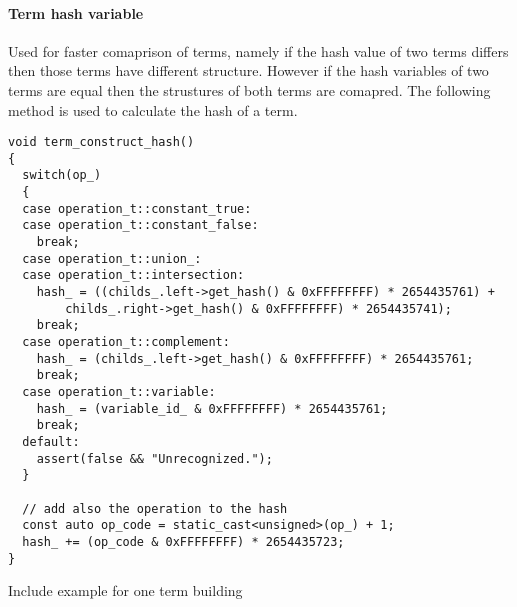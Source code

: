 \documentclass{article}
\begin{document}
	\paragraph{Term hash variable} Used for faster comaprison of terms, namely if the hash value of two terms 
	differs then those terms have different structure. However if the hash variables of two terms are equal then the strustures 
	of both terms are comapred. The following method is used to calculate the hash of a term.

	\begin{lstlisting}
void term_construct_hash()
{
  switch(op_)
  {
  case operation_t::constant_true:
  case operation_t::constant_false:
    break;
  case operation_t::union_:
  case operation_t::intersection:
    hash_ = ((childs_.left->get_hash() & 0xFFFFFFFF) * 2654435761) +
        childs_.right->get_hash() & 0xFFFFFFFF) * 2654435741);
    break;
  case operation_t::complement:
    hash_ = (childs_.left->get_hash() & 0xFFFFFFFF) * 2654435761;
    break;
  case operation_t::variable:
    hash_ = (variable_id_ & 0xFFFFFFFF) * 2654435761;
    break;
  default:
    assert(false && "Unrecognized.");
  }

  // add also the operation to the hash
  const auto op_code = static_cast<unsigned>(op_) + 1;
  hash_ += (op_code & 0xFFFFFFFF) * 2654435723;
}
	\end{lstlisting}

	Include example for one term building
	\newline
	\newline
\end{document}
